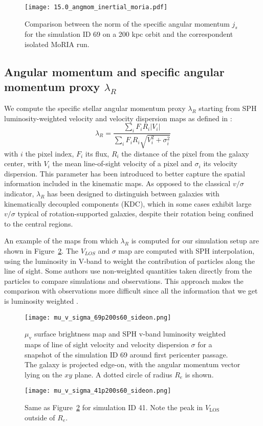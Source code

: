 \begin{figure}
\centering
\texttt{[image: 15.0\_angmom\_inertial\_moria.pdf]}
\caption{Comparison between the norm of the specific angular momentum $j_s$ for the simulation ID 69 on a 200 kpc orbit and the correspondent isolated MoRIA run.}
\label{fig:j_s_moria}
\end{figure}

\subsection{Angular momentum and specific angular momentum proxy $\lambda_R$}
We compute the specific stellar angular momentum proxy $\lambda_R$ starting from SPH luminosity-weighted velocity and velocity dispersion maps as defined in \citet{Emsellem2007}: %
\begin{equation}
 \lambda_R = \dfrac{\sum_i F_i R_i |V_i|}{\sum_i F_i R_i \sqrt{V_i^2 + \sigma_i^2}}
 \label{eq:lambda_r}
\end{equation}
with $i$ the pixel index, $F_i$ its flux, $R_i$ the distance of the pixel from the galaxy center, with $V_i$ the mean line-of-sight velocity of a pixel and $\sigma_i$ its velocity dispersion.
This parameter has been introduced to better capture the spatial information included in the kinematic maps.
As opposed to the classical $v/\sigma$ indicator, $\lambda_R$ has been designed to distinguish between galaxies with kinematically decoupled components (KDC),
which in some cases exhibit large $v/\sigma$ typical of rotation-supported galaxies, despite their rotation being confined to the central regions.

An example of the maps from which $\lambda_R$ is computed for our simulation setup are shown in Figure~\ref{fig:maps_lambda_r}.
The $V_{LOS}$ and $\sigma$ map are computed with SPH interpolation, using the luminosity in $\mathrm{V}$-band to weight the contribution of particles along the line of sight.
Some authors \citep[e.g.][]{Schulze2018,Pillepich2019} use non-weighted quantities taken directly from the particles to compare simulations and observations. %
This approach makes the comparison with observations more difficult since all the information that we get is luminosity weighted \citep{Walo-Martin2020}.

\begin{figure}[t]
\centering
\texttt{[image: mu\_v\_sigma\_69p200s60\_sideon.png]}
\caption{$\mu_\mathrm{v}$ surface brightness map and SPH v-band luminosity weighted maps of line of sight velocity and velocity dispersion $\sigma$ for a snapshot of the simulation ID 69 around first pericenter passage.
The galaxy is projected edge-on, with the angular momentum vector lying on the $xy$ plane.
A dotted circle of radius $R_e$ is shown.}
\label{fig:maps_lambda_r}
\end{figure}
\begin{figure}[t]
  \centering
  \texttt{[image: mu\_v\_sigma\_41p200s60\_sideon.png]}
  \caption{Same as Figure~\ref{fig:maps_lambda_r} for simulation ID 41. Note the peak in $V_{\mathrm{LOS}}$ outside of $R_e$.}
  \label{fig:maps_lambda_r_41}
\end{figure}

